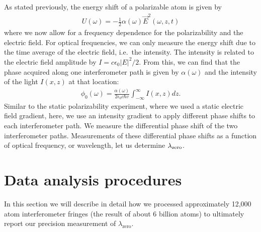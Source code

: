 As stated previously, the energy shift of a polarizable atom is given by 
\begin{eqnarray}
U(\omega) = -\frac{1}{2} \alpha(\omega) \vec{E}^2(\omega,z,t)
\end{eqnarray}
where we now allow for a frequency dependence for the polarizability and the electric field. For optical frequencies, we can only measure the energy shift due to the time average of the electric field, i.e.~the intensity. The intensity is related to the electric field amplitude by $I=c\epsilon_0 |E|^2/2$. From this, we can find that the phase acquired along one interferometer path is given by $\alpha(\omega)$ and the intensity of the light $I(x,z)$ at that location:
\begin{eqnarray}
\label{mzwIntEqn}
\phi_0(\omega) = \frac{\alpha(\omega)}{2\epsilon_0 c \hbar v}\int_{-\infty}^{\infty}I(x,z) dz.
\end{eqnarray}
Similar to the static polarizability experiment, where we used a static electric field gradient, here, we use an intensity gradient to apply different phase shifts to each interferometer path. We measure the differential phase shift of the two interferometer paths. Measurements of these differential phase shifts as a function of optical frequency, or wavelength, let us determine $\lambda_\textrm{zero}$.





\section{Data analysis procedures}
\label{mzwDataAnalysis}
In this section we will describe in detail how we processed approximately 12,000 atom interferometer fringes (the result of about 6 billion atoms) to ultimately report our precision measurement of $\lambda_\textrm{zero}$. 


